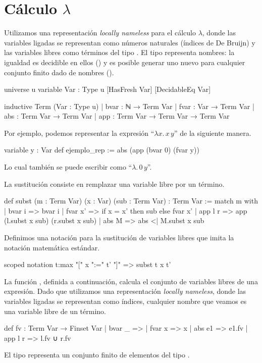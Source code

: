 \chapter{Cálculo $\lambda$}

\begin{defn}
Utilizamos una representación \textit{locally nameless} 
para el cálculo $\lambda$, donde las variables ligadas se representan 
como números naturales (índices de De Bruijn) y las variables libres como
términos del tipo . El tipo  representa nombres: 
la igualdad es decidible en ellos () 
y es posible generar uno nuevo para cualquier conjunto finito dado
de nombres ().
\begin{leancode}
universe u
variable {Var : Type u} [HasFresh Var] [DecidableEq Var]

inductive Term (Var : Type u)
  | bvar : ℕ → Term Var
  | fvar : Var → Term Var
  | abs  : Term Var → Term Var
  | app  : Term Var → Term Var → Term Var
\end{leancode}
Por ejemplo, podemos representar la expresión ``$\lambda x. \, x \, y$'' de la siguiente manera.
\begin{leancode}
variable {y : Var}
def ejemplo_rep := abs (app (bvar 0) (fvar y))
\end{leancode}
Lo cual también se puede escribir como ``$\lambda . \, 0 \, y$''. 
\end{defn}

\begin{defn}
La sustitución consiste en remplazar una variable libre por un término. 
\begin{leancode}
def subst (m : Term Var) (x : Var) (sub : Term Var) : Term Var :=
  match m with
  | bvar i  => bvar i
  | fvar x' => if x = x' then sub else fvar x'
  | app l r => app (l.subst x sub) (r.subst x sub)
  | abs M   => abs <| M.subst x sub
\end{leancode}
Definimos una notación para la sustitución de variables libres que imita la notación matemática estándar.
\begin{leancode}
scoped notation t:max "[" x ":=" t' "]" => subst t x t'
\end{leancode}
\end{defn}

\begin{defn}
La función , definida a continuación, 
calcula el conjunto de variables libres de una expresión. 
Dado que utilizamos una representación \textit{locally nameless}, 
donde las variables ligadas se representan como índices, 
cualquier nombre que veamos es una variable libre de un término.
\begin{leancode}
def fv : Term Var → Finset Var
  | bvar _ => {}
  | fvar x => {x}
  | abs e1 => e1.fv
  | app l r => l.fv ∪ r.fv
\end{leancode}
El tipo  representa un conjunto finito 
de elementos del tipo . 
\end{defn}

